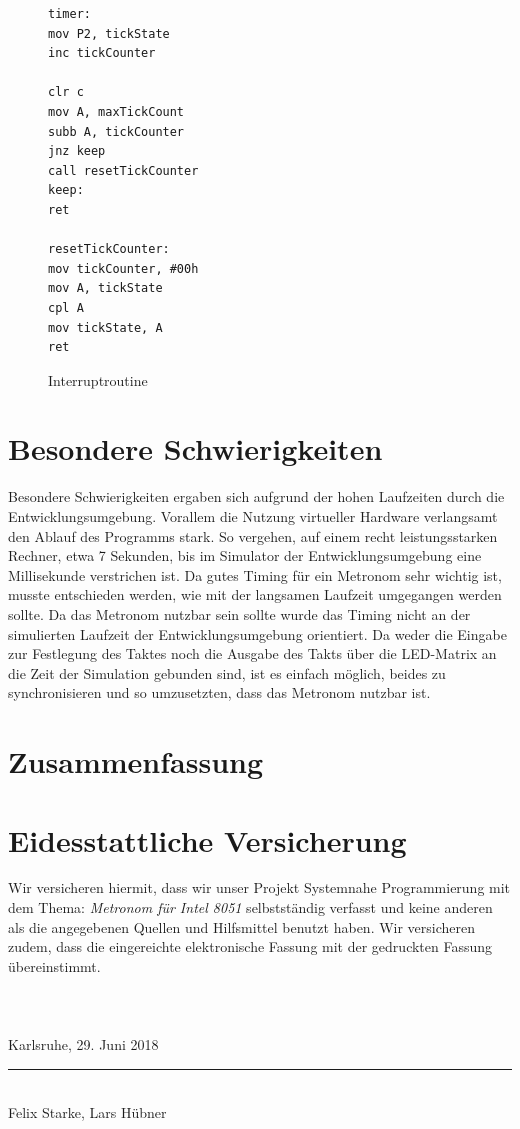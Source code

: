 \documentclass[a4paper, 12pt]{scrartcl}
\def \autoren {Felix Starke, Lars Hübner}
\def \titel {Metronom für Intel 8051}
\def \arbeit {Projekt Systemnahe Programmierung}
\begin{document}
\begin{onehalfspace}
\begin{figure}
\begin{lstlisting}
timer:
mov P2, tickState	
inc tickCounter		

clr c
mov A, maxTickCount
subb A, tickCounter	
jnz keep
call resetTickCounter	
keep:
ret

resetTickCounter:
mov tickCounter, #00h	
mov A, tickState	
cpl A
mov tickState, A
ret
\end{lstlisting}
\caption{Interruptroutine}
\label{lst:timer}
\end{figure}

\newpage
\section{Besondere Schwierigkeiten}
\label{schwierigkeiten}
Besondere Schwierigkeiten ergaben sich aufgrund der hohen Laufzeiten durch die Entwicklungsumgebung. Vorallem die Nutzung virtueller Hardware verlangsamt den Ablauf des Programms stark. So vergehen, auf einem recht leistungsstarken Rechner, etwa 7 Sekunden, bis im Simulator der Entwicklungsumgebung eine Millisekunde verstrichen ist. Da gutes Timing für ein Metronom sehr wichtig ist, musste entschieden werden, wie mit der langsamen Laufzeit umgegangen werden sollte. Da das Metronom nutzbar sein sollte wurde das Timing nicht an der simulierten Laufzeit der Entwicklungsumgebung orientiert. Da weder die Eingabe zur Festlegung des Taktes noch die Ausgabe des Takts über die LED-Matrix an die Zeit der Simulation gebunden sind, ist es einfach möglich, beides zu synchronisieren und so umzusetzten, dass das Metronom nutzbar ist.

\section{Zusammenfassung}


\newpage
\section{Eidesstattliche Versicherung}

Wir versicheren hiermit, dass wir unser {\arbeit} mit dem Thema: {\itshape \titel } selbstständig verfasst und keine anderen als die angegebenen Quellen und Hilfsmittel benutzt haben. Wir versicheren zudem, dass die eingereichte elektronische Fassung mit der gedruckten Fassung übereinstimmt. 
\\
\\
\\
\\
\vspace{3em}
Karlsruhe, 29. Juni 2018
\vspace{4em}
\\
\rule{10cm}{0.4pt}\\
\autoren

\end{onehalfspace}
\end{document}
